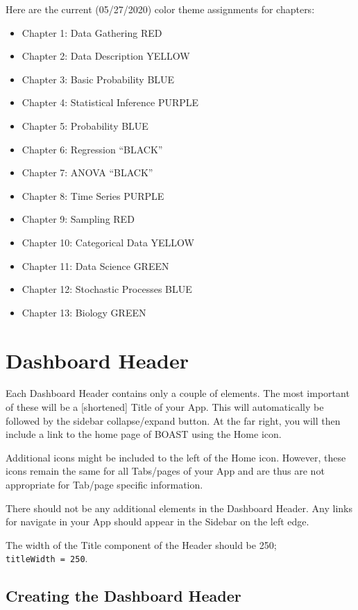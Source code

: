 \documentclass[
]{book}
\providecommand{\tightlist}{%
  \setlength{\itemsep}{0pt}\setlength{\parskip}{0pt}}
\begin{document}
Here are the current (05/27/2020) color theme assignments for chapters:

\begin{itemize}
\tightlist
\item
  Chapter 1: Data Gathering RED
\item
  Chapter 2: Data Description YELLOW
\item
  Chapter 3: Basic Probability BLUE
\item
  Chapter 4: Statistical Inference PURPLE
\item
  Chapter 5: Probability BLUE
\item
  Chapter 6: Regression ``BLACK''
\item
  Chapter 7: ANOVA ``BLACK''
\item
  Chapter 8: Time Series PURPLE
\item
  Chapter 9: Sampling RED
\item
  Chapter 10: Categorical Data YELLOW
\item
  Chapter 11: Data Science GREEN
\item
  Chapter 12: Stochastic Processes BLUE
\item
  Chapter 13: Biology GREEN
\end{itemize}

\hypertarget{header}{%
\section{Dashboard Header}\label{header}}

Each Dashboard Header contains only a couple of elements. The most important of these will be a {[}shortened{]} Title of your App. This will automatically be followed by the sidebar collapse/expand button. At the far right, you will then include a link to the home page of BOAST using the Home icon.

Additional icons might be included to the left of the Home icon. However, these icons remain the same for all Tabs/pages of your App and are thus are not appropriate for Tab/page specific information.

There should not be any additional elements in the Dashboard Header. Any links for navigate in your App should appear in the Sidebar on the left edge.

The width of the Title component of the Header should be 250; \texttt{titleWidth\ =\ 250}.

\hypertarget{creating-the-dashboard-header}{%
\subsection{Creating the Dashboard Header}\label{creating-the-dashboard-header}}
\end{document}
